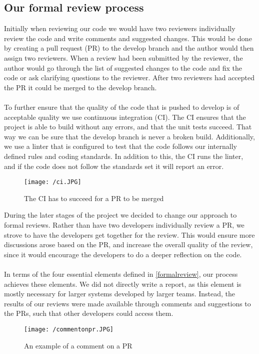 \subsection{Our formal review process}
Initially when reviewing our code we would have two reviewers individually review the code and write comments and suggested changes. 
This would be done by creating a pull request (PR) to the develop branch and the author would then assign two reviewers.
When a review had been submitted by the reviewer, the author would go through the list of suggested changes to the code and fix the code or ask clarifying questions to the reviewer.
After two reviewers had accepted the PR it could be merged to the develop branch. 
\\\\
To further ensure that the quality of the code that is pushed to develop is of acceptable quality we use continuous integration (CI).
The CI ensures that the project is able to build without any errors, and that the unit tests succeed. 
That way we can be sure that the develop branch is never a broken build.
Additionally, we use a linter that is configured to test that the code follows our internally defined rules and coding standards. 
In addition to this, the CI runs the linter, and if the code does not follow the standards set it will report an error.
\begin{figure}[H]
    \texttt{[image: /ci.JPG]}
    \caption{The CI has to succeed for a PR to be merged}
    \label{fig:continous-integration}
\end{figure}
\noindent
During the later stages of the project we decided to change our approach to formal reviews.
Rather than have two developers individually review a PR, we strove to have the developers get together for the review.
This would ensure more discussions arose based on the PR, and increase the overall quality of the review, since it would encourage the developers to do a deeper reflection on the code.
\\\\
In terms of the four essential elements defined in \autoref{formalreview}, our process achieves these elements.
We did not directly write a report, as this element is mostly necessary for larger systems developed by larger teams.
Instead, the results of our reviews were made available through comments and suggestions to the PRs, such that other developers could access them.
\begin{figure}[H]
    \texttt{[image: /commentonpr.JPG]}
    \caption{An example of a comment on a PR}
    \label{fig:comment-on-pr}
\end{figure}
